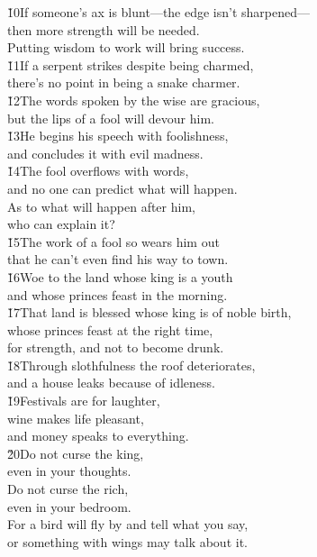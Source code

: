 \begin{poetry}
\poeml \v{10}If someone's ax is blunt---the edge isn't sharpened--- \\
\poemll    then more strength will be needed. \\
\poemlll       Putting wisdom to work will bring success. \\
\poeml \v{11}If a serpent strikes despite being charmed, \\
\poemll    there's no point in being a snake charmer. \\
\poeml \v{12}The words spoken by the wise are gracious, \\
\poemll    but the lips of a fool will devour him. \\
\poeml \v{13}He begins his speech with foolishness, \\
\poemll    and concludes it with evil madness. \\
\poeml \v{14}The fool overflows with words, \\
\poemll    and no one can predict what will happen. \\
\poeml As to what will happen after him, \\
\poemll    who can explain it? \\
\poeml \v{15}The work of a fool so wears him out \\
\poemll    that he can't even find his way to town. \\
\poeml \v{16}Woe to the land whose king is a youth \\
\poemll    and whose princes feast in the morning. \\
\poeml \v{17}That land is blessed whose king is of noble birth, \\
\poemll    whose princes feast at the right time, \\
\poemlll       for strength, and not to become drunk. \\
\poeml \v{18}Through slothfulness the roof deteriorates, \\
\poemll    and a house leaks because of idleness. \\
\poeml \v{19}Festivals are for laughter, \\
\poemll    wine makes life pleasant, \\
\poemlll       and money speaks to everything. \\
\poeml \v{20}Do not curse the king, \\
\poemll    even in your thoughts. \\
\poeml Do not curse the rich, \\
\poemll    even in your bedroom. \\
\poeml For a bird will fly by and tell what you say, \\
\poemll    or something with wings may talk about it.
\end{poetry}

